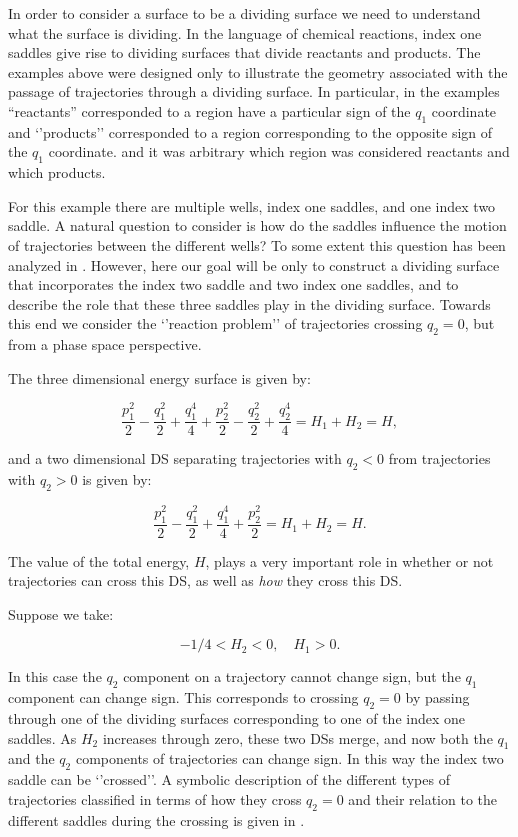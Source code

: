 \documentclass{article}
\begin{document}
In order to consider a surface to be a dividing surface  we need to understand what the surface is dividing. In the language of chemical reactions,  index one saddles give rise to dividing surfaces that  divide reactants and products.  The examples above were designed  only to illustrate the geometry associated with the passage of trajectories through a dividing surface. In particular,  in the examples ``reactants'' corresponded to a region have a particular sign of the $q_1$  coordinate and `'products'' corresponded to a region corresponding to the opposite sign of the $q_1$ coordinate. and it was arbitrary which region was considered reactants and which products.  




For this example there are multiple wells, index one saddles, and one index two saddle. 
A natural  question to consider is how do the saddles influence  the motion of trajectories between the different wells? To some extent this question has been analyzed in \cite{collins:244105}. However, here  our goal will be only to construct a dividing surface that incorporates the index two saddle and two index one saddles, and to describe the role that these three saddles play in the dividing surface. Towards this end we consider the `'reaction problem'' of trajectories crossing $q_2=0$, but from a phase space perspective. 

The three dimensional energy surface is given by:

\begin{equation}
\frac{p_1^2}{2} - \frac{q_1^2}{2} + \frac{q_1^4}{4} +
\frac{p_2^2}{2} - \frac{q_2^2}{2} + \frac{q_2^4}{4}  = H_1 + H_2 = H,
\label{esGDS}
\end{equation}

\noindent
and a two dimensional DS separating trajectories with $q_2 <0$ from trajectories with $q_2 >0$ is given by:

\begin{equation}
\frac{p_1^2}{2} - \frac{q_1^2}{2} + \frac{q_1^4}{4} +
\frac{p_2^2}{2}  = H_1 + H_2 = H.
\label{GDS}
\end{equation}

\noindent 
The value of the total energy, $H$, plays a very important role in whether or not trajectories can cross this DS, as well as {\em how} they cross this DS.

Suppose we take:

\[
-1/4 < H_2 <0, \quad H_1 > 0.
\]

\noindent
In this case the $q_2$ component on a trajectory cannot change sign, but the $q_1$ component  can change sign.  This corresponds to crossing $q_2 =0$ by passing through one of the dividing surfaces corresponding to one of the index one saddles. As $H_2$ increases through zero, these two DSs merge, and now both the $q_1$ and the $q_2$ components of trajectories can change sign. In this way the index two saddle can be `'crossed''. A symbolic description of the different types of  trajectories classified  in terms of how they cross $q_2=0$ and their relation to the different saddles during the crossing is given in \cite{ezra2009phase,collins:244105}.
\end{document}

